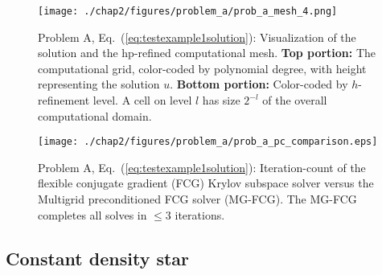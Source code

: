 
\begin{figure}
  \centering
  \texttt{[image: ./chap2/figures/problem\_a/prob\_a\_mesh\_4.png]}
  
  \caption{ \label{fig:test_example_1_mesh} Problem A,
    Eq.~(\ref{eq:testexample1solution}): Visualization of the
      solution and the hp-refined computational mesh.  {\bf Top
        portion:} The computational grid, color-coded by polynomial
      degree, with height representing the solution $u$.  {\bf Bottom
        portion:} Color-coded by $h$-refinement level.  A cell on
      level $l$ has size $2^{-l}$ of the overall computational
      domain.}
\end{figure}


\begin{figure}[ht!]
  \centering
  \texttt{[image: ./chap2/figures/problem\_a/prob\_a\_pc\_comparison.eps]}
  \caption{Problem A, Eq.~(\ref{eq:testexample1solution}): Iteration-count of the flexible conjugate gradient (FCG) Krylov subspace solver versus the Multigrid preconditioned FCG solver (MG-FCG). The MG-FCG completes all solves in $\leq 3$ iterations.}
  \label{fig:mgfcg_vs_fcg}
\end{figure}

\subsection{Constant density star}

